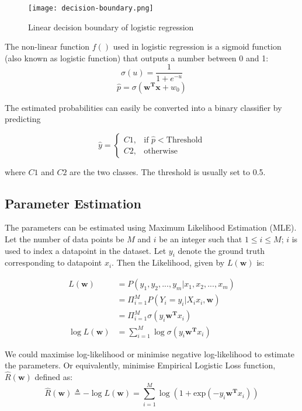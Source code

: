 \documentclass[conference]{IEEEtran}
\begin{document}
\begin{figure}[tbh]
\centering
\texttt{[image: decision-boundary.png]}
\caption{Linear decision boundary of logistic regression}
\label{decision-boundary}
\end{figure}

The non-linear function $f ()$ used in logistic regression is a sigmoid function (also known as logistic function) that outputs a number between 0 and 1: $$ \sigma(u) = \frac{1}{1 + e^{-u}} $$ $$ \hat{p} = \sigma(\mathbf{w^Tx} + w_0) $$

The estimated probabilities can easily be converted into a binary classifier by predicting

$$   \hat{y}= 
\begin{cases}
    C1,& \textrm{if } \hat{p} < \textrm{Threshold}\\
    C2, & \text{otherwise}
\end{cases} $$



where $C 1$ and $C 2$ are the two classes. The threshold is usually
set to 0.5.

\subsection*{Parameter Estimation}

The parameters can be estimated using Maximum Likelihood Estimation (MLE). Let the number of data points be $M$ and $i$ be an integer such that $1 \leq i \leq M$; $i$ is used to index a datapoint in the dataset. Let $y_i$ denote the ground truth corresponding to datapoint $x_i$. Then the Likelihood, given by $L(\mathbf{w})$ is:


\begin{align*}
    L(\mathbf{w}) &= P(y_1, y_2, ..., y_m|x_1, x_2, ..., x_m) \\
 &= \Pi_{i = 1}^{M} P(Y_i = y_i|X_i x_i, \mathbf{w}) \\
 &= \Pi_{i = 1}^{M}\sigma(y_i\mathbf{w^T}x_i)  \\
 \log{ L(\mathbf{w})} &= \sum_{i = 1}^{M}\log{\sigma(y_i\mathbf{w^T}x_i)}
\end{align*}

We could maximise log-likelihood or minimise negative log-likelihood to estimate the parameters. Or equivalently, minimise Empirical Logistic Loss function, $\hat{R}(\mathbf{w})$ defined as:
$$ \hat{R}(\mathbf{w}) \triangleq -\log{L(\mathbf{w})} = \sum_{i=1}^{M}\log{(1 + \textrm{exp}(-y_i\mathbf{w^T}x_i))}$$
      
\end{document}
